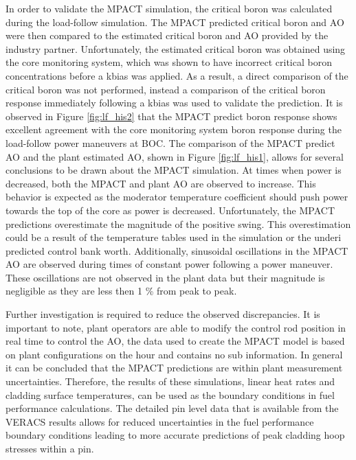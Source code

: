 \documentclass[edeposit,fullpage,11pt]{uiucthesis2009}
\begin{document}
In order to validate the MPACT simulation, the critical boron was calculated during the load-follow simulation. 
The MPACT predicted critical boron and \gls{AO} were then compared to the estimated critical boron and \gls{AO} provided by the industry partner.
Unfortunately, the estimated critical boron was obtained using the core monitoring system, which was shown to have incorrect critical boron concentrations before a kbias was applied. 
As a result, a direct comparison of the critical boron was not performed, instead a comparison of the critical boron response immediately following a kbias was used to validate the prediction.
It is observed in Figure \ref{fig:lf_his2} that the MPACT predict boron response shows excellent agreement with the core monitoring system boron response during the load-follow power maneuvers at \gls{BOC}.
The comparison of the MPACT predict \gls{AO} and the plant estimated \gls{AO}, shown in Figure \ref{fig:lf_his1}, allows for several conclusions to be drawn about the MPACT simulation.
At times when power is decreased, both the MPACT and plant \gls{AO} are observed to increase.
This behavior is expected as the moderator temperature coefficient should push power towards the top of the core as power is decreased.
Unfortunately, the MPACT predictions overestimate the magnitude of the positive swing.
This overestimation could be a result of the temperature tables used in the simulation or the underi predicted control bank worth.
Additionally, sinusoidal oscillations in the MPACT \gls{AO} are observed during times of constant power following a power maneuver.
These oscillations are not observed in the plant data but their magnitude is negligible as they are less then 1 \% from peak to peak.
  
Further investigation is required to reduce the observed discrepancies.
It is important to note, plant operators are able to modify the control rod position in real time to control the \gls{AO}, the data used to create the MPACT model is based on plant configurations on the hour and contains no sub information.
In general it can be concluded that the MPACT predictions are within plant measurement uncertainties.
Therefore, the results of these simulations, linear heat rates and cladding surface temperatures, can be used as the boundary conditions in fuel performance calculations.
The detailed pin level data that is available from the \gls{VERACS} results allows for reduced uncertainties in the fuel performance boundary conditions leading to more accurate predictions of peak cladding hoop stresses within a pin.
\end{document}
